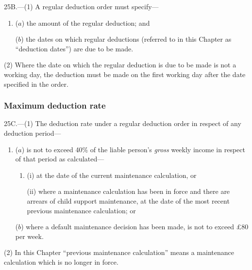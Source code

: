 \documentclass[12pt,a4paper]{article}
\begin{document}
25B.---(1)  A regular deduction order must specify—
\begin{enumerate}\item[]
($a$) the amount of the regular deduction; and

($b$) the dates on which regular deductions (referred to in this Chapter as “deduction dates”) are due to be made.
\end{enumerate}

(2) Where the date on which the regular deduction is due to be made is not a working day, the deduction must be made on the first working day after the date specified in the order.

\subsubsection[25C. Maximum deduction rate]{Maximum deduction rate}

25C.---(1)  The deduction rate under a regular deduction order in respect of any deduction period—
\begin{enumerate}\item[]
($a$) is not to exceed 40\% of the liable person’s 
\emph{gross}  %
weekly income in respect of that period as calculated—
\begin{enumerate}\item[]
(i) at the date of the current maintenance calculation, or

(ii) where a maintenance calculation has been in force and there are arrears of child support maintenance, at the date of the most recent previous maintenance calculation; or
\end{enumerate}

($b$) where a default maintenance decision has been made, is not to exceed £80 per week.
\end{enumerate}

(2) In this Chapter “previous maintenance calculation” means a maintenance calculation which is no longer in force.

\end{document}
